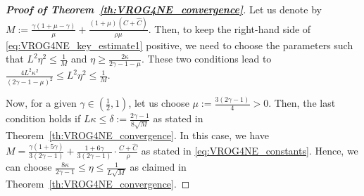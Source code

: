 \documentclass{article}
\theoremstyle{plain}
\theoremstyle{definition}
\theoremstyle{remark}
\begin{document}
\begin{proof}[\textbf{Proof of Theorem~\ref{th:VROG4NE_convergence}}]
Let us denote by $M := \frac{\gamma(1 + \mu - \gamma)}{ \mu} + \frac{ (1+\mu)(C + \hat{C})}{ \rho \mu }$.
Then, to keep the right-hand side of  \eqref{eq:VROG4NE_key_estimate1} positive, we need to choose the parameters such that  $L^2\eta^2 \leq \frac{1}{M}$ and $\eta \geq \frac{2\kappa}{2\gamma - 1 - \mu}$.
These two conditions lead to $\frac{4L^2\kappa^2}{(2\gamma - 1 - \mu)^2} \leq L^2\eta^2 \leq \frac{1}{M}$.

Now, for a given $\gamma \in \left(\frac{1}{2}, 1 \right)$, let us choose $\mu := \frac{3(2\gamma - 1)}{4} > 0$.
Then, the last condition holds if $L\kappa \leq \delta := \frac{2\gamma-1}{8\sqrt{M}}$ as stated in Theorem~\ref{th:VROG4NE_convergence}.
In this case, we have $M = \frac{\gamma(1+5\gamma)}{3(2\gamma-1)} + \frac{1 + 6\gamma}{3(2\gamma -1) } \cdot \frac{C + \hat{C}}{\rho}$ as stated in \eqref{eq:VROG4NE_constants}.
Hence, we can choose $\frac{8\kappa}{2\gamma-1} \leq \eta \leq \frac{1}{L\sqrt{M}}$ as claimed in Theorem~\ref{th:VROG4NE_convergence}. %


\end{proof}
\end{document}

